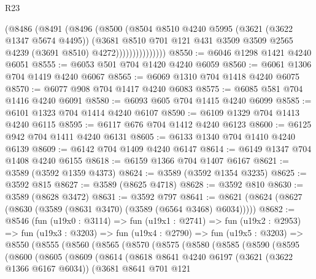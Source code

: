 \begin{lexlean}{R23}
\begin{coremodule}
                      (@8486
                        (@8491
                          (@8496
                            (@8500
                              (@8504
                                @8510
                                @4240
                                @5995
                                (@3621 (@3622 @1347 @5674 @4495))
                                (@3681
                                  @8510
                                  @701
                                  @121
                                  @431
                                  @3509
                                  @3509
                                  @2565
                                  @4239
                                  (@3691 @8510)
                                  @4272)))))))))))))))
@8550 := @6046 @1298 @1421 @4240 @6051
@8555 := @6053 @501 @704 @1420 @4240 @6059
@8560 := @6061 @1306 @704 @1419 @4240 @6067
@8565 := @6069 @1310 @704 @1418 @4240 @6075
@8570 := @6077 @908 @704 @1417 @4240 @6083
@8575 := @6085 @581 @704 @1416 @4240 @6091
@8580 := @6093 @605 @704 @1415 @4240 @6099
@8585 := @6101 @1323 @704 @1414 @4240 @6107
@8590 := @6109 @1329 @704 @1413 @4240 @6115
@8595 := @6117 @676 @704 @1412 @4240 @6123
@8600 := @6125 @942 @704 @1411 @4240 @6131
@8605 := @6133 @1340 @704 @1410 @4240 @6139
@8609 := @6142 @704 @1409 @4240 @6147
@8614 := @6149 @1347 @704 @1408 @4240 @6155
@8618 := @6159 @1366 @704 @1407 @6167
@8621 := @3589 (@3592 @1359 @4373)
@8624 := @3589 (@3592 @1354 @3235)
@8625 := @3592 @815
@8627 := @3589 (@8625 @4718)
@8628 := @3592 @810
@8630 := @3589 (@8628 @3472)
@8631 := @3592 @797
@8641 := @8621 (@8624 (@8627 (@8630 (@3589 (@8631 @3470) (@3589 (@6564 @3468) @6034)))))
@8682 := @8546
    (fun (u19x0 : @3114) =>
    fun (u19x1 : @2741) =>
    fun (u19x2 : @2953) =>
    fun (u19x3 : @3203) =>
    fun (u19x4 : @2790) =>
    fun (u19x5 : @3203) =>
    @8550
      (@8555
        (@8560
          (@8565
            (@8570
              (@8575
                (@8580
                  (@8585
                    (@8590
                      (@8595
                        (@8600
                          (@8605
                            (@8609
                              (@8614
                                (@8618
                                  @8641
                                  @4240
                                  @6197
                                  (@3621 (@3622 @1366 @6167 @6034))
                                  (@3681
                                    @8641
                                    @701
                                    @121

\end{coremodule}
\end{lexlean}
